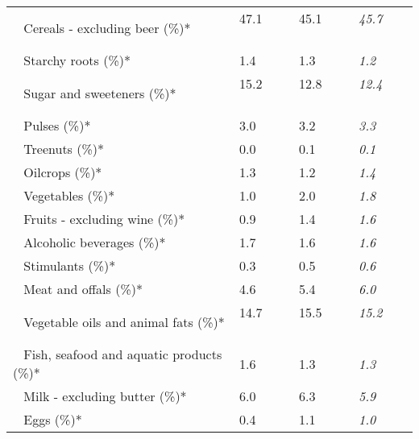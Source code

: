 \begin{tabular}{L{3.9cm} R{1cm} R{1cm} R{1cm}}
	 ~ Cereals - excluding beer (\%)* & 47.1 ~ \ \ & 45.1 ~ \ \ & \textit{45.7} ~ \ \ \\ 
	 ~ Starchy roots (\%)* & 1.4 ~ \ \ & 1.3 ~ \ \ & \textit{1.2} ~ \ \ \\ 
	 ~ Sugar and sweeteners (\%)* & 15.2 ~ \ \ & 12.8 ~ \ \ & \textit{12.4} ~ \ \ \\ 
	 ~ Pulses (\%)* & 3.0 ~ \ \ & 3.2 ~ \ \ & \textit{3.3} ~ \ \ \\ 
	 ~ Treenuts (\%)* & 0.0 ~ \ \ & 0.1 ~ \ \ & \textit{0.1} ~ \ \ \\ 
	 ~ Oilcrops (\%)* & 1.3 ~ \ \ & 1.2 ~ \ \ & \textit{1.4} ~ \ \ \\ 
	 ~ Vegetables (\%)* & 1.0 ~ \ \ & 2.0 ~ \ \ & \textit{1.8} ~ \ \ \\ 
	 ~ Fruits - excluding wine (\%)* & 0.9 ~ \ \ & 1.4 ~ \ \ & \textit{1.6} ~ \ \ \\ 
	 ~ Alcoholic beverages (\%)* & 1.7 ~ \ \ & 1.6 ~ \ \ & \textit{1.6} ~ \ \ \\ 
	 ~ Stimulants (\%)* & 0.3 ~ \ \ & 0.5 ~ \ \ & \textit{0.6} ~ \ \ \\ 
	 ~ Meat and offals (\%)* & 4.6 ~ \ \ & 5.4 ~ \ \ & \textit{6.0} ~ \ \ \\ 
	 ~ Vegetable oils and animal fats (\%)* & 14.7 ~ \ \ & 15.5 ~ \ \ & \textit{15.2} ~ \ \ \\ 
	 ~ Fish, seafood and aquatic products (\%)* & 1.6 ~ \ \ & 1.3 ~ \ \ & \textit{1.3} ~ \ \ \\ 
	 ~ Milk - excluding butter (\%)* & 6.0 ~ \ \ & 6.3 ~ \ \ & \textit{5.9} ~ \ \ \\ 
	 ~ Eggs (\%)* & 0.4 ~ \ \ & 1.1 ~ \ \ & \textit{1.0} ~ \ \ \\ 
       \toprule
      \end{tabular}
      \clearpage
{}
